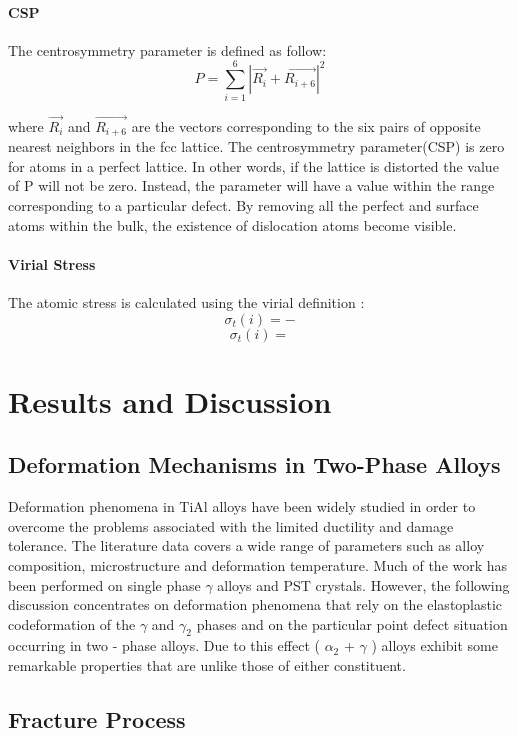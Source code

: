 \documentclass[times]{elsarticle}
\begin{document}
\paragraph{CSP}
The centrosymmetry parameter is defined as follow:
\begin{equation} \label{eq:csp} 
	P = \displaystyle\sum_{i=1}^{6}|\vec{R_i}+\vec{R_{i+6}}|^2
\end{equation}

where $\vec{R_i}$ and $\vec{R_{i+6}}$ are the vectors corresponding to the six pairs of opposite nearest neighbors in the fcc lattice. The centrosymmetry parameter(CSP) is zero for atoms in a perfect lattice. In other words, if the lattice is distorted the value of P will not be zero. Instead, the parameter will have a value within the range corresponding to a particular defect. By removing all the perfect and surface atoms within the bulk, the existence of dislocation atoms become visible.
	
\paragraph{Virial Stress}
The atomic stress is calculated using the virial definition :
$$\sigma_t(i)=-$$
$$\sigma_t(i)= $$
 
\section{Results and Discussion}

\subsection{Deformation Mechanisms in Two-Phase Alloys}
Deformation phenomena in TiAl alloys have been widely studied in order to overcome the problems associated with the limited ductility and damage tolerance. The literature data covers a wide range of parameters such as alloy composition, microstructure and deformation temperature. Much of the work has been performed on single phase $\gamma$ alloys and PST crystals. However, the following discussion concentrates on deformation phenomena that rely on the elastoplastic codeformation of the $\gamma$ and $\gamma_2$ phases and on the particular point defect situation occurring in two - phase alloys. Due to this effect ( $\alpha_2$ + $\gamma$ ) alloys exhibit some remarkable properties that are unlike those of either constituent.

\subsection{Fracture Process}
\end{document}
